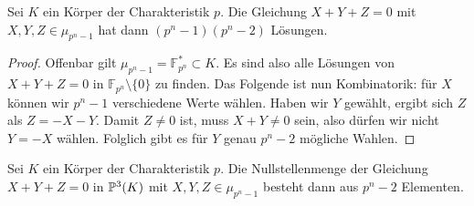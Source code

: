 \begin{lemma}
Sei $K$ ein Körper der Charakteristik $p$. Die Gleichung $X+Y+Z=0$ mit $X,Y,Z \in \mu_{p^n-1}$ hat dann $(p^n-1)(p^n-2)$ Lösungen.
\end{lemma}
\begin{proof}
Offenbar gilt $\mu_{p^n-1} = \mathbb F_{p^n}^* \subset K$. Es sind also alle Lösungen von $X+Y+Z=0$ in $\mathbb F_{p^n} \setminus \{0\}$ zu finden. Das Folgende ist nun Kombinatorik: für $X$ können wir $p^n-1$ verschiedene Werte wählen. Haben wir $Y$ gewählt, ergibt sich $Z$ als $Z=-X-Y$. Damit $Z \neq 0$ ist, muss $X+Y \neq 0$ sein, also dürfen wir nicht $Y = -X$ wählen. Folglich gibt es für $Y$ genau $p^n-2$ mögliche Wahlen.
\end{proof}
\begin{coroll}
Sei $K$ ein Körper der Charakteristik $p$. Die Nullstellenmenge der Gleichung $X+Y+Z=0$ in $\mathbb P^{3}(K)$ mit $X,Y,Z \in \mu_{p^n-1}$ besteht dann aus $p^n-2$ Elementen.
\end{coroll}

